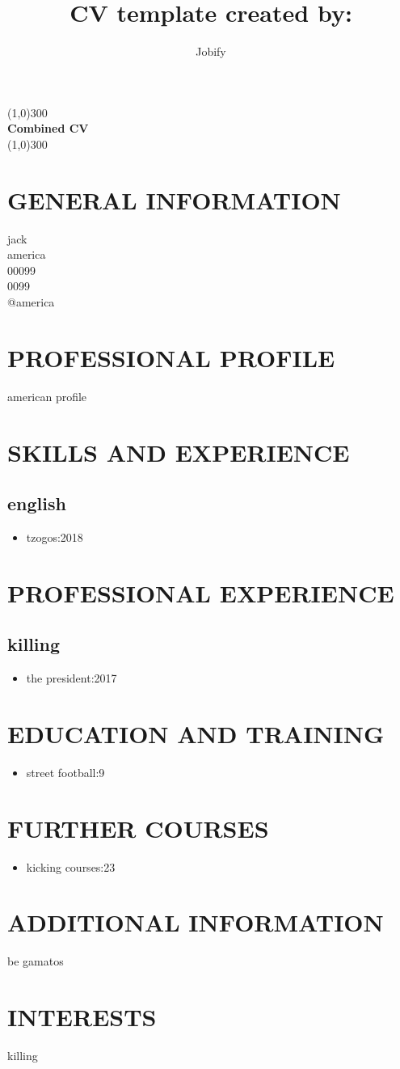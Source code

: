 \documentclass{article}
\title{CV template created by:}
\author{Jobify}
\begin{document}
\maketitle
	\begin{center}
	\line(1,0){300}\\
	[0.25in]
	\huge{\bfseries Combined CV}\\
	[2mm]
	\line(1,0){300}\\
	[1.5cm]
	\end{center}
\section{GENERAL INFORMATION}
jack\\
america\\
00099\\
0099\\
@america\\
\section{PROFESSIONAL PROFILE}
american profile\\
\section{SKILLS AND EXPERIENCE}
\subsection{english}
\begin{itemize}
\item tzogos:2018
\end{itemize}
\section{PROFESSIONAL EXPERIENCE}
\subsection{killing}
\begin{itemize}
\item the president:2017
\end{itemize}
\section{EDUCATION AND TRAINING}
\begin{itemize}
\item street football:9
\end{itemize}
\section{FURTHER COURSES}
\begin{itemize}
\item kicking courses:23
\end{itemize}
\section{ADDITIONAL INFORMATION}
be gamatos	\\
\section{INTERESTS}
killing\\
\end{document}
